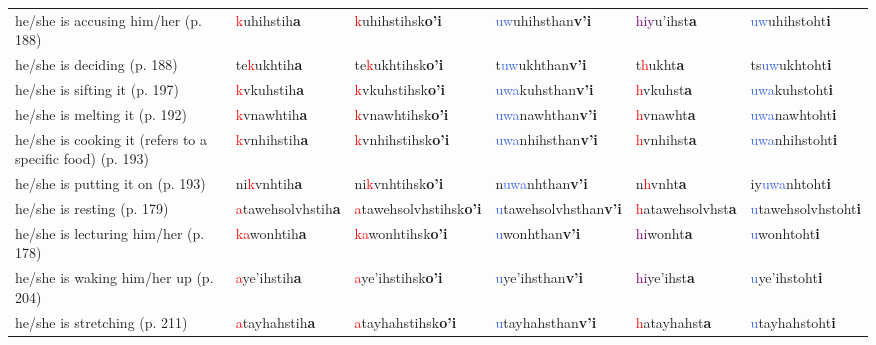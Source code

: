 \documentclass[oneside,openany]{book}%
\begin{document}
\begin{tabularx}{\textwidth}{>{\hsize=1.5\hsize\RaggedRight}X >{\hsize=0.9\hsize}X >{\hsize=0.9\hsize}X >{\hsize=0.9\hsize}X >{\hsize=0.9\hsize}X >{\hsize=0.9\hsize}X}
he/she is accusing him/her (p. 188)&\textcolor{Red}{k}uhihstih\textbf{a}&\textcolor{Red}{k}uhihstihsk\textbf{o'i}&\textcolor{RoyalBlue}{uw}uhihsthan\textbf{v'i}&\textcolor{Purple}{hiy}u'ihst\textbf{a}&\textcolor{RoyalBlue}{uw}uhihstoht\textbf{i}\\%
he/she is deciding (p. 188)&te\textcolor{Red}{k}ukhtih\textbf{a}&te\textcolor{Red}{k}ukhtihsk\textbf{o'i}&t\textcolor{RoyalBlue}{uw}ukhthan\textbf{v'i}&t\textcolor{Red}{h}ukht\textbf{a}&ts\textcolor{RoyalBlue}{uw}ukhtoht\textbf{i}\\%
he/she is sifting it (p. 197)&\textcolor{Red}{k}vkuhstih\textbf{a}&\textcolor{Red}{k}vkuhstihsk\textbf{o'i}&\textcolor{RoyalBlue}{uwa}kuhsthan\textbf{v'i}&\textcolor{Red}{h}vkuhst\textbf{a}&\textcolor{RoyalBlue}{uwa}kuhstoht\textbf{i}\\%
he/she is melting it (p. 192)&\textcolor{Red}{k}vnawhtih\textbf{a}&\textcolor{Red}{k}vnawhtihsk\textbf{o'i}&\textcolor{RoyalBlue}{uwa}nawhthan\textbf{v'i}&\textcolor{Red}{h}vnawht\textbf{a}&\textcolor{RoyalBlue}{uwa}nawhtoht\textbf{i}\\%
he/she is cooking it (refers to a specific food) (p. 193)&\textcolor{Red}{k}vnhihstih\textbf{a}&\textcolor{Red}{k}vnhihstihsk\textbf{o'i}&\textcolor{RoyalBlue}{uwa}nhihsthan\textbf{v'i}&\textcolor{Red}{h}vnhihst\textbf{a}&\textcolor{RoyalBlue}{uwa}nhihstoht\textbf{i}\\%
he/she is putting it on (p. 193)&ni\textcolor{Red}{k}vnhtih\textbf{a}&ni\textcolor{Red}{k}vnhtihsk\textbf{o'i}&n\textcolor{RoyalBlue}{uwa}nhthan\textbf{v'i}&n\textcolor{Red}{h}vnht\textbf{a}&iy\textcolor{RoyalBlue}{uwa}nhtoht\textbf{i}\\%
he/she is resting (p. 179)&\textcolor{Red}{a}tawehsolvhstih\textbf{a}&\textcolor{Red}{a}tawehsolvhstihsk\textbf{o'i}&\textcolor{RoyalBlue}{u}tawehsolvhsthan\textbf{v'i}&\textcolor{Red}{h}atawehsolvhst\textbf{a}&\textcolor{RoyalBlue}{u}tawehsolvhstoht\textbf{i}\\%
he/she is lecturing him/her (p. 178)&\textcolor{Red}{ka}wonhtih\textbf{a}&\textcolor{Red}{ka}wonhtihsk\textbf{o'i}&\textcolor{RoyalBlue}{u}wonhthan\textbf{v'i}&\textcolor{Purple}{hi}wonht\textbf{a}&\textcolor{RoyalBlue}{u}wonhtoht\textbf{i}\\%
he/she is waking him/her up (p. 204)&\textcolor{Red}{a}ye'ihstih\textbf{a}&\textcolor{Red}{a}ye'ihstihsk\textbf{o'i}&\textcolor{RoyalBlue}{u}ye'ihsthan\textbf{v'i}&\textcolor{Purple}{hi}ye'ihst\textbf{a}&\textcolor{RoyalBlue}{u}ye'ihstoht\textbf{i}\\%
he/she is stretching (p. 211)&\textcolor{Red}{a}tayhahstih\textbf{a}&\textcolor{Red}{a}tayhahstihsk\textbf{o'i}&\textcolor{RoyalBlue}{u}tayhahsthan\textbf{v'i}&\textcolor{Red}{h}atayhahst\textbf{a}&\textcolor{RoyalBlue}{u}tayhahstoht\textbf{i}\\%

\end{tabularx}
\end{document}
